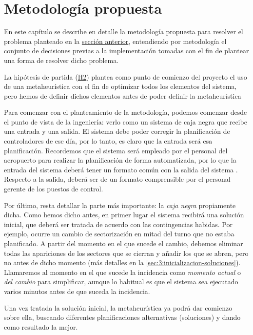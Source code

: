 \graphicspath{{capitulos/Capitulo3-Metodologia-propuesta/recursos/}}

\section{Metodología propuesta} \label{capitulo:3}
En este capítulo se describe en detalle la metodología propuesta para resolver el problema planteado en la \hyperref[capitulo:2]{sección anterior}, entendiendo por metodología el conjunto de decisiones previas a la implementación tomadas con el fin de plantear una forma de resolver dicho problema.

La hipótesis de partida (\hyperref[H2]{H2}) plantea como punto de comienzo del proyecto el uso de una metaheurística con el fin de optimizar todos los elementos del sistema, pero hemos de definir dichos elementos antes de poder definir la metaheurística

Para comenzar con el planteamiento de la metodología, podemos comenzar desde el punto de vista de la ingeniería: verlo como un sistema de caja negra que recibe una entrada y una salida.
El sistema debe poder corregir la planificación de controladores de ese día, por lo tanto, es claro que la entrada será esa planificación. Recordemos que el sistema \legacy{} será empleado por el personal del aeropuerto para realizar la planificación de forma automatizada, por lo que la entrada del sistema deberá tener un formato común con la salida del sistema \legacy{}.
Respecto a la salida, deberá ser de un formato comprensible por el personal gerente de los puestos de control.

Por último, resta detallar la parte más importante: la \textit{caja negra} propiamente dicha. Como hemos dicho antes, en primer lugar el sistema recibirá una solución inicial, que deberá ser tratada de acuerdo con las contingencias habidas. Por ejemplo, ocurre un cambio de sectorización en mitad del turno que no estaba planificado. 
A partir del momento en el que sucede el cambio, debemos eliminar todas las apariciones de los sectores que se cierran y añadir los que se abren, pero no antes de dicho momento (más detalles en la \autoref{sec:3:inicializacion-soluciones}). 
Llamaremos al momento en el que sucede la incidencia como \textit{momento actual} o \textit{del cambio} para simplificar, aunque lo habitual es que el sistema sea ejecutado varios minutos antes de que suceda la incidencia.

Una vez tratada la solución inicial, la metaheurística ya podrá dar comienzo sobre ella, buscando diferentes 
planificaciones alternativas (soluciones) y dando como resultado la mejor. 

